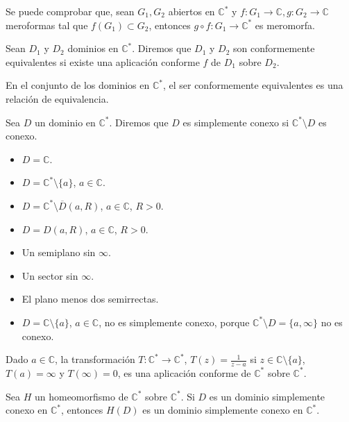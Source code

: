 Se puede comprobar que, sean $G_1, G_2$ abiertos en $\mathbb{C}^\ast$ y $f: G_1 \to \mathbb{C}, g: G_2 \to \mathbb{C}$ meroformas tal que $f(G_1) \subset G_2$, entonces $g \circ f: G_1 \to \mathbb{C}^\ast$ es meromorfa.

\begin{definition}
    Sean $D_1$ y $D_2$ dominios en $\mathbb{C}^\ast$.
    Diremos que $D_1$ y $D_2$ son conformemente equivalentes si existe una aplicación conforme $f$ de $D_1$ sobre $D_2$.

    En el conjunto de los dominios en $\mathbb{C}^\ast$, el ser conformemente equivalentes es una relación de equivalencia.
\end{definition}

\begin{definition}
    Sea $D$ un dominio en $\mathbb{C}^\ast$.
    Diremos que $D$ es simplemente conexo si $\mathbb{C}^\ast \setminus D$ es conexo.
\end{definition}

\begin{example}
    \hfill
    \begin{itemize}
        \item $D = \mathbb{C}$.
        \item $D = \mathbb{C}^\ast \setminus \{a\}$, $a \in \mathbb{C}$.
        \item $D = \mathbb{C}^\ast \setminus \overline{D}(a, R)$, $a \in \mathbb{C}$, $R > 0$.
        \item $D = D(a, R)$, $a \in \mathbb{C}$, $R > 0$.
        \item Un semiplano sin $\infty$.
        \item Un sector sin $\infty$.
        \item El plano menos dos semirrectas.
        \item $D = \mathbb{C} \setminus \{a\}$, $a \in \mathbb{C}$, no es simplemente conexo, porque $\mathbb{C}^\ast \setminus D = \{a, \infty\}$ no es conexo.
    \end{itemize}
\end{example}

\begin{lemma}
    Dado $a \in \mathbb{C}$, la transformación $T: \mathbb{C}^\ast \to \mathbb{C}^\ast$, $T(z) = \frac{1}{z-a}$ si $z \in \mathbb{C} \setminus \{a\}$, $T(a) = \infty$ y $T(\infty) = 0$, es una aplicación conforme de $\mathbb{C}^\ast$ sobre $\mathbb{C}^\ast$.
\end{lemma}

\begin{lemma}
    Sea $H$ un homeomorfismo de $\mathbb{C}^\ast$ sobre $\mathbb{C}^\ast$.
    Si $D$ es un dominio simplemente conexo en $\mathbb{C}^\ast$, entonces $H(D)$ es un dominio simplemente conexo en $\mathbb{C}^\ast$.
\end{lemma}


